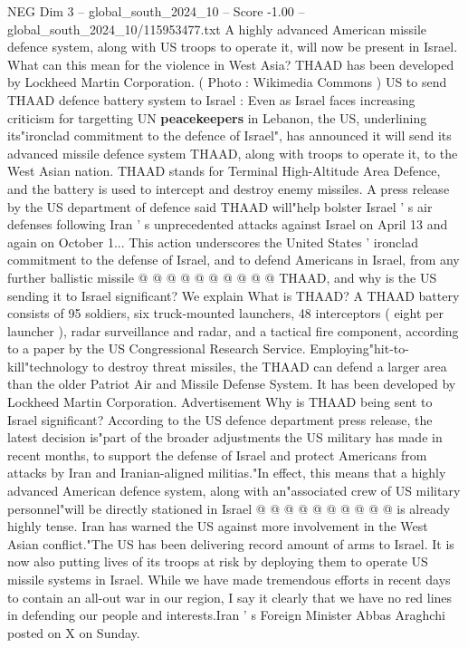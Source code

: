 \begin{textsample}{NEG Dim 3 – global\_south\_2024\_10 – Score -1.00 – global\_south\_2024\_10/115953477.txt}  \label{ex:f3_neg_054}
A highly advanced American missile defence system, along with US troops to operate it, will now be present in Israel.
What can this mean for the violence in West Asia?
THAAD has been developed by Lockheed Martin Corporation. ( Photo : Wikimedia Commons ) US to send THAAD defence battery system to Israel : Even as Israel faces increasing criticism for targetting UN \textbf{peacekeepers} in Lebanon, the US, underlining its"ironclad commitment to the defence of Israel", has announced it will send its advanced missile defence system THAAD, along with troops to operate it, to the West Asian nation.
THAAD stands for Terminal High-Altitude Area Defence, and the battery is used to intercept and destroy enemy missiles.
A press release by the US department of defence said THAAD will"help bolster Israel ' s air defenses following Iran ' s unprecedented attacks against Israel on April 13 and again on October 1...
This action underscores the United States ' ironclad commitment to the defense of Israel, and to defend Americans in Israel, from any further ballistic missile @ @ @ @ @ @ @ @ @ @ THAAD, and why is the US sending it to Israel significant?
We explain What is THAAD?
A THAAD battery consists of 95 soldiers, six truck-mounted launchers, 48 interceptors ( eight per launcher ), radar surveillance and radar, and a tactical fire component, according to a paper by the US Congressional Research Service.
Employing"hit-to-kill"technology to destroy threat missiles, the THAAD can defend a larger area than the older Patriot Air and Missile Defense System.
It has been developed by Lockheed Martin Corporation.
Advertisement Why is THAAD being sent to Israel significant?
According to the US defence department press release, the latest decision is"part of the broader adjustments the US military has made in recent months, to support the defense of Israel and protect Americans from attacks by Iran and Iranian-aligned militias."In effect, this means that a highly advanced American defence system, along with an"associated crew of US military personnel"will be directly stationed in Israel @ @ @ @ @ @ @ @ @ @ is already highly tense.
Iran has warned the US against more involvement in the West Asian conflict."The US has been delivering record amount of arms to Israel.
It is now also putting lives of its troops at risk by deploying them to operate US missile systems in Israel.
While we have made tremendous efforts in recent days to contain an all-out war in our region, I say it clearly that we have no red lines in defending our people and interests.Iran ' s Foreign Minister Abbas Araghchi posted on X on Sunday.

\end{textsample}
